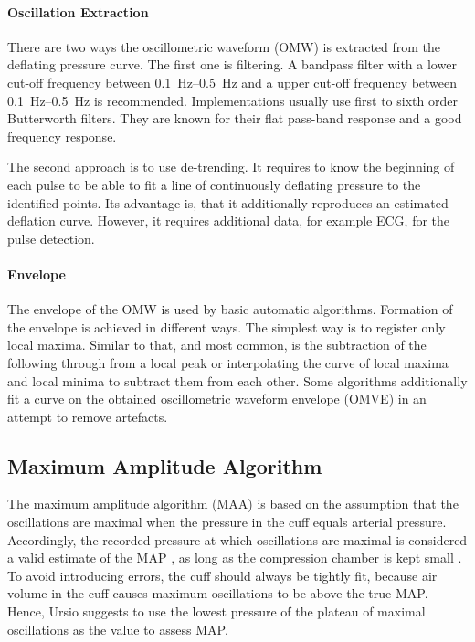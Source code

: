 \paragraph{Oscillation Extraction} There are two ways the oscillometric waveform (OMW) is extracted from the deflating pressure curve. The first one is filtering. A  bandpass filter with a lower cut-off frequency between \SIrange{0.1}{0.5}{\Hz} and a upper cut-off frequency between \SIrange{0.1}{0.5}{\Hz} is recommended. \cite{Forouzanfar2015} Implementations usually use first \cite{Lim2015} to sixth order \cite{Jazbinsek2010} Butterworth filters. They are known for their flat pass-band response and a good frequency response.

The second approach is to use de-trending. It requires to know the beginning of each pulse to be able to fit a line of continuously deflating pressure to the identified points. Its advantage is, that it additionally reproduces an estimated deflation curve. However, it requires additional data, for example ECG, for the pulse detection.\cite{Forouzanfar2015}

\paragraph{Envelope} The envelope of the OMW is used by basic automatic algorithms. Formation of the envelope is achieved in different ways. The simplest way is to register only local maxima. Similar to that, and most common, is the subtraction of the following through from a local peak or interpolating the curve of local maxima and local minima to subtract them from each other. Some algorithms additionally fit a curve on the obtained oscillometric waveform envelope (OMVE) in an attempt to remove artefacts. \cite{Forouzanfar2014}


\subsection{Maximum Amplitude Algorithm}
The maximum amplitude algorithm (MAA) is based on the assumption that the oscillations are maximal when the pressure in the cuff equals arterial pressure. Accordingly, the recorded pressure at which oscillations are maximal is considered a valid estimate of the MAP \cite{Babbs2012,Geddes1982,Drzewiecki1994}\cite{Ramsey1979}, as long as the compression chamber is kept small \cite{Mauck1980}. To avoid introducing errors, the cuff should always be tightly fit, because air volume in the cuff causes maximum oscillations to be above the true MAP. Hence, Ursio suggests to use the lowest pressure of the plateau of maximal oscillations as the value to assess MAP.\cite{Ursino1996}

